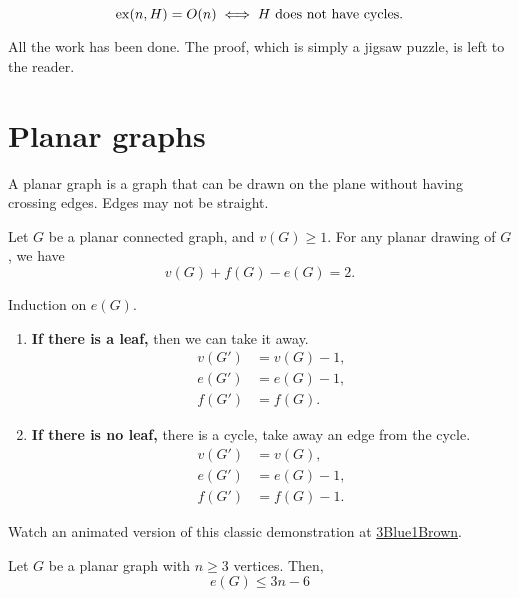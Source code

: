 \begin{thm}
	\[
		\operatorname{ex}(n, H) = O(n) \iff H\ \text{does not have cycles}.
	\]
\end{thm}

\begin{dem}
	All the work has been done. The proof, which is simply a jigsaw puzzle, is left to the reader.
\end{dem}

\newpage
\section{Planar graphs}

\begin{defn}
	A planar graph is a graph that can be drawn on the plane without having crossing edges. Edges may not be straight.
\end{defn}

\begin{lem}[$V + F - E = 2$]
	Let $G$ be a planar connected graph, and $v(G) \ge 1$. For any planar drawing of $G$, we have \[
		v(G) + f(G) - e(G) = 2.
	\]
\end{lem}

\begin{sk}
	Induction on $e(G)$.

	\begin{enumerate}
		\item \textbf{If there is a leaf,} then we can take it away.
			\begin{align*}
				v(G') &= v(G) - 1, \\
				e(G') &= e(G) - 1, \\
				f(G') &= f(G).
			\end{align*}
		\item \textbf{If there is no leaf,} there is a cycle, take away an edge from the cycle.
			\begin{align*}
				v(G') &= v(G),     \\
				e(G') &= e(G) - 1, \\
				f(G') &= f(G) - 1. 
			\end{align*}
	\end{enumerate}
\end{sk}

	Watch an animated version of this classic demonstration at \href{https://youtu.be/VvCytJvd4H0?t=382}{3Blue1Brown}.

\begin{thm}
	Let $G$ be a planar graph with $n \ge 3$ vertices. Then, \[
		e(G) \le 3n - 6
	\]
\end{thm}

